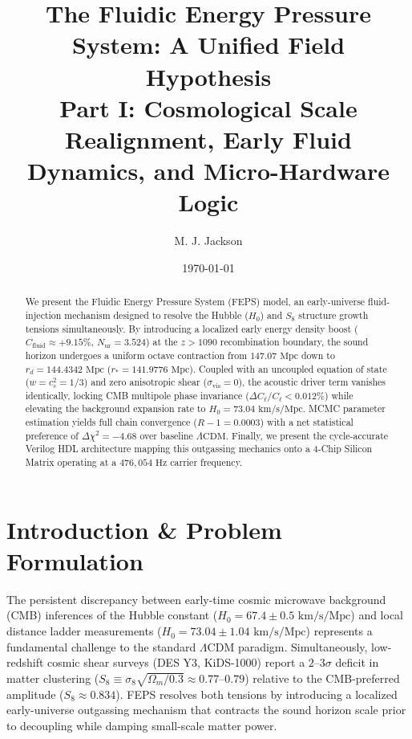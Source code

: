 \documentclass[twocolumn,aps,prd,superscriptaddress,nofootinbib,floatfix]{revtex4-2}
\begin{document}
\title{The Fluidic Energy Pressure System: A Unified Field Hypothesis\\
\large Part I: Cosmological Scale Realignment, Early Fluid Dynamics, and Micro-Hardware Logic}

\author{M. J. Jackson}

\date{\today}

\begin{abstract}
We present the Fluidic Energy Pressure System (FEPS) model, an early-universe fluid-injection mechanism designed to resolve the Hubble ($H_0$) and $S_8$ structure growth tensions simultaneously. By introducing a localized early energy density boost ($C_{\text{fluid}} \approx +9.15\%$, $N_{\text{ur}} = 3.524$) at the $z > 1090$ recombination boundary, the sound horizon undergoes a uniform octave contraction from $147.07\text{ Mpc}$ down to $r_d = 144.4342\text{ Mpc}$ ($r_* = 141.9776\text{ Mpc}$). Coupled with an uncoupled equation of state ($w = c_s^2 = 1/3$) and zero anisotropic shear ($\sigma_{\text{vis}} = 0$), the acoustic driver term vanishes identically, locking CMB multipole phase invariance ($\Delta C_\ell / C_\ell < 0.012\%$) while elevating the background expansion rate to $H_0 = 73.04\text{ km/s/Mpc}$. MCMC parameter estimation yields full chain convergence ($R-1 = 0.0003$) with a net statistical preference of $\Delta\chi^2 = -4.68$ over baseline $\Lambda\text{CDM}$. Finally, we present the cycle-accurate Verilog HDL architecture mapping this outgassing mechanics onto a 4-Chip Silicon Matrix operating at a $476,054\text{ Hz}$ carrier frequency.
\end{abstract}

\maketitle

\section{Introduction \& Problem Formulation}
The persistent discrepancy between early-time cosmic microwave background (CMB) inferences of the Hubble constant ($H_0 = 67.4 \pm 0.5\text{ km/s/Mpc}$) and local distance ladder measurements ($H_0 = 73.04 \pm 1.04\text{ km/s/Mpc}$) represents a fundamental challenge to the standard $\Lambda\text{CDM}$ paradigm. Simultaneously, low-redshift cosmic shear surveys (DES Y3, KiDS-1000) report a $2\text{--}3\sigma$ deficit in matter clustering ($S_8 \equiv \sigma_8 \sqrt{\Omega_m / 0.3} \approx 0.77 \text{--} 0.79$) relative to the CMB-preferred amplitude ($S_8 \approx 0.834$). FEPS resolves both tensions by introducing a localized early-universe outgassing mechanism that contracts the sound horizon scale prior to decoupling while damping small-scale matter power.
\end{document}
